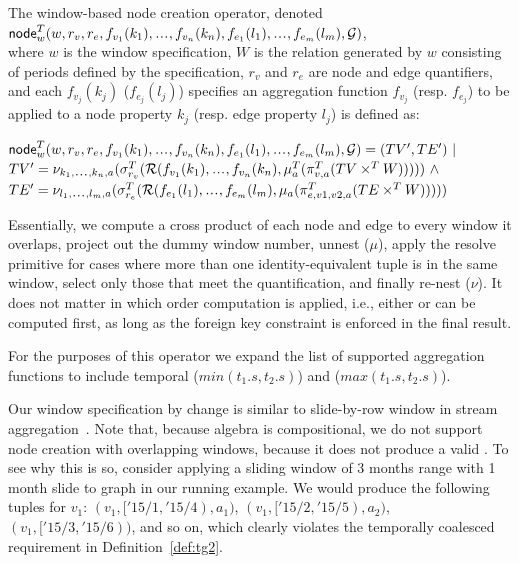 \begin{definition}
\label{def:nodecrw}
The window-based node creation operator, denoted
$\insql{node}^T_w(w,r_v,r_e,f_{v_1}(k_1)\varlist f_{v_n}(k_n),f_{e_1}(l_1)\varlist f_{e_m}(l_m),\ttt)$,\\
where $w$ is the window specification, $W$ is the relation generated
by $w$ consisting of periods defined by the specification, $r_v$ and
$r_e$ are node and edge quantifiers, and each $f_{v_j}(k_j)$
($f_{e_j}(l_j)$) specifies an aggregation function $f_{v_j}$
(resp. $f_{e_j}$) to be applied to a node property $k_j$ (resp. edge
property $l_j$) is defined as:

$\insql{node}^T_w(w,r_v,r_e,f_{v_1}(k_1)\varlist f_{v_n}(k_n),f_{e_1}(l_1)\varlist f_{e_m}(l_m),\ttt) = (TV', TE') ~|~ $\\$TV' = \nu_{k_1\varlist k_n,a}(\sigma^T_{r_v}(\resolve{f_{v_1}(k_1)\varlist f_{v_n}(k_n)}{\break\mu^T_a(\pi^T_{v,a}(TV \times^T W))})) ~\land$\\
$TE' = \nu_{l_1\varlist l_m,a}(\sigma^T_{r_e}(\resolve{f_{e_1}(l_1)\varlist f_{e_m}(l_m)}{\mu_a(\break\pi^T_{e,v1,v2,a}(TE \times^T W))}))$
\end{definition}

Essentially, we compute a cross product of each node and edge to every
window it overlaps, project out the dummy window number, unnest
($\mu$), apply the resolve primitive for cases
where more than one identity-equivalent tuple is in the same window,
select only those that meet the quantification, and finally re-nest
($\nu$).  It does not matter in which order
computation is applied, i.e., either \tv or \te can be computed first,
as long as the foreign key constraint is enforced in the final result.

For the purposes of this operator we expand the list of supported
aggregation functions to include temporal 
($min(t_1.s,t_2.s)$) and  ($max(t_1.s,t_2.s)$).

Our window specification by change is similar to slide-by-row window
in stream aggregation~\cite{Li2005}.  Note that, because \tg algebra
is compositional, we do not support node creation with overlapping
windows, because it does not produce a valid \tg.  To see why this is
so, consider applying a sliding window of 3 months range with 1 month
slide to graph  in our running example.  We would
produce the following tuples for $v_1$: $(v_1, ['15/1, '15/4), a_1)$,
  $(v_1, ['15/2, '15/5), a_2)$, $(v_1, ['15/3, '15/6))$, and so on, which
      clearly violates the temporally coalesced requirement in
      Definition~\ref{def:tg2}.

